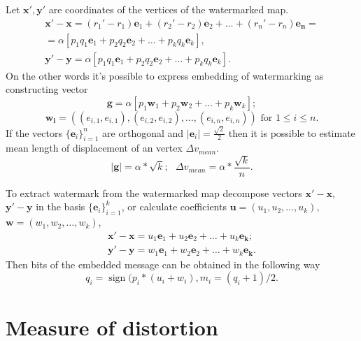 \documentclass{article}
\newcommand{\sgn}{\operatorname{sign}}
\begin{document}
Let $\mathbf{x'}, \mathbf{y'}$ are coordinates of the vertices of the watermarked map. 
\begin{eqnarray*}
  \mathbf{x'} - \mathbf{x} = (r_1' - r_1) \mathbf{e}_1 + (r_2' - r_2) \mathbf{e}_2 + \dots + (r_n' - r_n) \mathbf{e_n} = \\
  = \alpha \left[ p_1 q_1 \mathbf{e}_1 + p_2 q_2 \mathbf{e}_2 + \dots + p_k q_k \mathbf{e}_k \right], \\
  \mathbf{y'} - \mathbf{y} = \alpha \left[ p_1 q_1 \mathbf{e}_1 + p_2 q_2 \mathbf{e}_2 + \dots + p_k q_k \mathbf{e}_k \right]. 
\end{eqnarray*}
On the other words it's possible to express embedding of watermarking as constructing vector 
\begin{equation}
\label{formula:g}
 \mathbf{g} = \alpha \left[ p_1 \mathbf{w}_1 + p_2 \mathbf{w}_2 + \dots + p_k \mathbf{w}_k \right]; 
\end{equation}
$$ \mathbf{w_i} = \left( (e_{i, 1}, e_{i, 1}), (e_{i, 2}, e_{i, 2}), \dots, (e_{i, n}, e_{i, n}) \right) \mbox{ for } 1 \le i \le n. $$
If the vectors $\{\mathbf{e}_i\}_{i=1}^n$ are orthogonal and $|\mathbf{e}_i| = \frac{\sqrt{2}}{2}$ then it is possible to estimate mean length of displacement of an vertex $\Delta v_{mean}$.
\begin{equation}
\label{formula:mean_displacement}
|\mathbf{g}| = \alpha * \sqrt {k}; \mbox{      } \Delta v_{mean} = \alpha * \frac{\sqrt{k}}{n}. 
\end{equation}

To extract watermark from the watermarked map decompose vectors $\mathbf{x'} - \mathbf{x}$, $\mathbf{y'} - \mathbf{y}$ in the basis $\{\mathbf{e}_i\}_{i=1}^k$, or calculate coefficients 
$\mathbf{u} = (u_1, u_2, \dots, u_k)$, $\mathbf{w} = (w_1, w_2, \dots, w_k)$, 
\begin{eqnarray*}
  \mathbf{x'} - \mathbf{x} = u_1 \mathbf{e}_1 + u_2 \mathbf{e}_2 + \dots + u_k \mathbf{e_k}; \\ 
  \mathbf{y'} - \mathbf{y} = w_1 \mathbf{e}_1 + w_2 \mathbf{e}_2 + \dots + w_k \mathbf{e_k}.  
\end{eqnarray*}
Then bits of the embedded message can be obtained in the following way
$$q_i = \sgn(p_i * (u_i + w_i), m_i = (q_i + 1) / 2.$$

\section{Measure of distortion} 
\label{sec:dist_measure}
\end{document}
